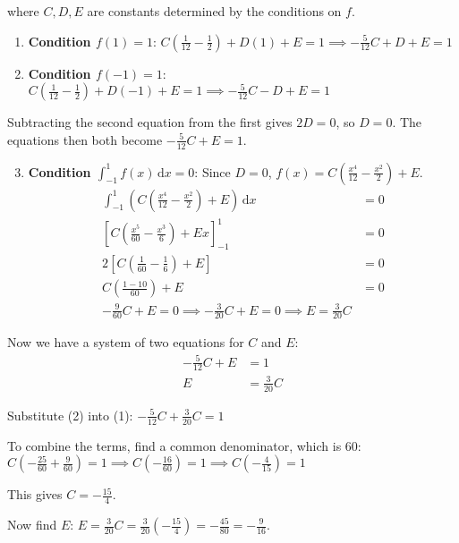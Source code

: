 \documentclass[12pt,a4paper]{article}
\theoremstyle{definition}
\begin{document}
where $C, D, E$ are constants determined by the conditions on $f$.

\begin{enumerate}
\item \textbf{Condition $f(1) = 1$}:
    $C\left(\frac{1}{12} - \frac{1}{2}\right) + D(1) + E = 1 \implies -\frac{5}{12}C + D + E = 1$

\item \textbf{Condition $f(-1) = 1$}:
    $C\left(\frac{1}{12} - \frac{1}{2}\right) + D(-1) + E = 1 \implies -\frac{5}{12}C - D + E = 1$
\end{enumerate}

Subtracting the second equation from the first gives $2D = 0$, so $D=0$.
The equations then both become $-\frac{5}{12}C + E = 1$.

\begin{enumerate}
\setcounter{enumi}{2}
\item \textbf{Condition $\int_{-1}^{1} f(x)\,\mathrm{d}x = 0$}:
    Since $D=0$, $f(x) = C\left(\frac{x^4}{12} - \frac{x^2}{2}\right) + E$.
    \begin{align*}
    \int_{-1}^{1} \left(C\left(\frac{x^4}{12} - \frac{x^2}{2}\right) + E\right)\,\mathrm{d}x &= 0 \\
    \left[C\left(\frac{x^5}{60} - \frac{x^3}{6}\right) + Ex\right]_{-1}^{1} &= 0 \\
    2\left[C\left(\frac{1}{60} - \frac{1}{6}\right) + E\right] &= 0 \\
    C\left(\frac{1-10}{60}\right) + E &= 0 \\
    -\frac{9}{60}C + E = 0 \implies -\frac{3}{20}C + E = 0 \implies E = \frac{3}{20}C
    \end{align*}
\end{enumerate}

Now we have a system of two equations for $C$ and $E$:
\begin{align}
-\frac{5}{12}C + E &= 1 \\
E &= \frac{3}{20}C
\end{align}

Substitute (2) into (1):
$-\frac{5}{12}C + \frac{3}{20}C = 1$

To combine the terms, find a common denominator, which is 60:
$C\left(-\frac{25}{60} + \frac{9}{60}\right) = 1 \implies C\left(-\frac{16}{60}\right) = 1 \implies C\left(-\frac{4}{15}\right) = 1$

This gives $C = -\frac{15}{4}$.

Now find $E$:
$E = \frac{3}{20}C = \frac{3}{20}\left(-\frac{15}{4}\right) = -\frac{45}{80} = -\frac{9}{16}$.
\end{document}
